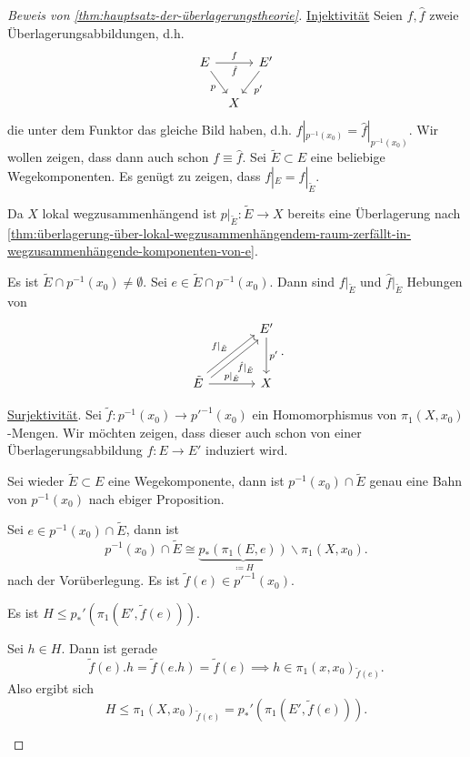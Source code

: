 \begin{proof}[Beweis von \autoref{thm:hauptsatz-der-überlagerungstheorie}]
    \underline{Injektivität} Seien $f,\hat{f}$ zweie Überlagerungsabbildungen, d.h.
    \[
    \begin{tikzcd}[column sep = tiny]
        E \ar{rr}{f}[swap]{\hat{f}} \ar[swap]{dr}{p} & & E' \ar{dl}{p'} \\
    & X
    \end{tikzcd}
    \]
    die unter dem Funktor das gleiche Bild haben, d.h. $f|_{p^{-1} (x_0)} = \hat{f}|_{p^{-1} (x_0)}$. Wir wollen zeigen, dass dann auch schon $f \equiv  \hat{f}$. Sei $\tilde{E} \subset E$ eine beliebige Wegekomponenten. Es genügt zu zeigen, dass $f|_E = \hat{f}|_{\tilde{E}}$.

    Da $X$ lokal wegzusammenhängend ist  $p|_{\tilde{E}}\colon \tilde{E} \to  X$ bereits eine Überlagerung nach \autoref{thm:überlagerung-über-lokal-wegzusammenhängendem-raum-zerfällt-in-wegzusammenhängende-komponenten-von-e}.

    Es ist $\tilde{E} \cap  p^{-1} (x_0) \neq  \emptyset$. Sei $e\in \tilde{E} \cap  p^{-1} (x_0)$. Dann sind $f|_{\tilde{E}}$ und $\hat{f}|_{\tilde{E}}$ Hebungen von
    \[
        \begin{tikzcd}[column sep = large, row sep = large]
        & E' \ar{d}{p'} \\
        \tilde{E} \ar[shift left]{ur}{f|_{\tilde{E}}} \ar[shift right, swap]{ur}{\hat{f}|_{\tilde{E}}} \ar{r}{p|_{\tilde{E}}} & X
    \end{tikzcd}
    .\] 

    \underline{Surjektivität}. Sei $\tilde{f} \colon  p^{-1} (x_0) \to  p'^{-1}(x_0)$ ein Homomorphismus von $\pi_1(X,x_0)$-Mengen. Wir möchten zeigen, dass dieser auch schon von einer Überlagerungsabbildung $f\colon  E \to  E'$ induziert wird. 

    Sei wieder $\tilde{E} \subset E$ eine Wegekomponente, dann ist $p^{-1} (x_0) \cap \tilde{E}$ genau eine Bahn von $p^{-1} (x_0)$ nach ebiger Proposition.

    Sei $e\in p^{-1} (x_0) \cap \tilde{E}$, dann ist
    \[
        p^{-1} (x_0) \cap  \tilde{E} \cong \underbrace{p_*(\pi_1(E,e))}_{\coloneqq H} \backslash \pi_1(X,x_0)
    .\] 
    nach der Vorüberlegung. Es ist $\tilde{f}(e) \in p'^{-1}(x_0)$.

    \begin{claim}
        Es ist $H\leq  p_*'(\pi_1(E',\tilde{f}(e)))$.
    \end{claim}
    \begin{subproof}
        Sei $h\in H$. Dann ist gerade
        \[
            \tilde{f}(e).  h = \tilde{f}(e.h) = \tilde{f}(e) \implies h\in \pi_1(x,x_0)_{\tilde{f}(e)}
        .\] 
        Also ergibt sich
        \[
            H \leq  \pi_1(X,x_0)_{\tilde{f}(e)} = p_*'(\pi_1(E',\tilde{f}(e)))
        .\] 
    \end{subproof}


\end{proof}
